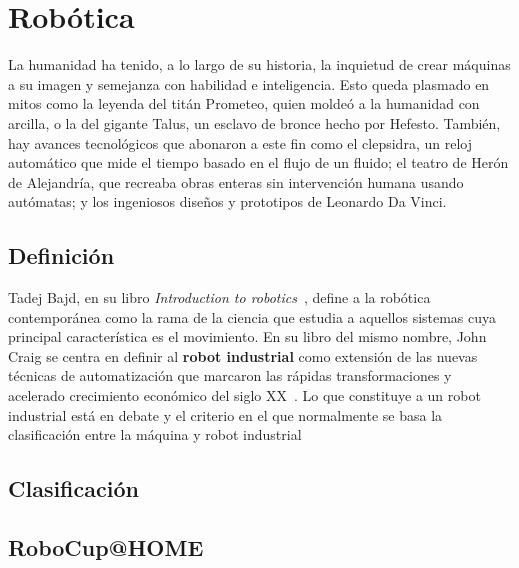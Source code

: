 \section{Robótica}

La humanidad ha tenido, a lo largo de su historia, la inquietud de crear máquinas a su imagen y semejanza con habilidad e inteligencia. Esto queda plasmado en mitos como la leyenda del titán Prometeo, quien moldeó a la humanidad con arcilla, o la del gigante Talus, un esclavo de bronce hecho por Hefesto. También, hay avances tecnológicos que abonaron a este fin como el clepsidra, un reloj automático que mide el tiempo basado en el flujo de un fluido; el teatro de Herón de Alejandría, que recreaba obras enteras sin intervención humana usando autómatas; y los ingeniosos diseños y prototipos de Leonardo Da Vinci.~\cite{handbook_robotics}

\subsection{Definición}

Tadej Bajd, en su libro \emph{Introduction to robotics}~\cite{bajd_intro}, define a la robótica contemporánea como la rama de la ciencia que estudia a aquellos sistemas cuya principal característica es el movimiento. En su libro del mismo nombre, John Craig se centra en definir al \textbf{robot industrial} como extensión de las nuevas técnicas de automatización que marcaron las rápidas transformaciones y acelerado crecimiento económico del siglo XX~\cite{craig_intro}. Lo que constituye a un robot industrial está en debate y el criterio en el que normalmente se basa la clasificación entre la máquina y robot industrial

\subsection{Clasificación}


\subsection{RoboCup@HOME}